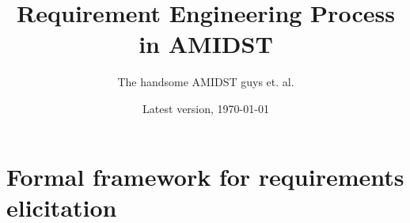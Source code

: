 \documentclass[11pt, oneside]{article}   	%
\title{Requirement Engineering Process in AMIDST}
\author{The handsome AMIDST guys et. al.}
\date{Latest version, \today}							%
\begin{document}
\maketitle
%
%














\appendix


\section{Formal framework for requirements elicitation}
\label{sec:form-fram-requ}


\end{document}
